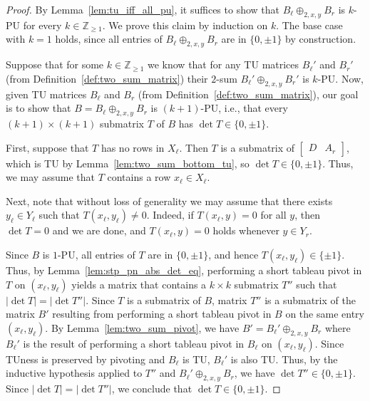 \begin{proof}
    By Lemma~\ref{lem:tu_iff_all_pu}, it suffices to show that $B_{\ell} \oplus_{2, x, y} B_{r}$ is $k$-PU for every $k \in \mathbb{Z}_{\geq 1}$. We prove this claim by induction on $k$. The base case with $k = 1$ holds, since all entries of $B_{\ell} \oplus_{2, x, y} B_{r}$ are in $\{0, \pm 1\}$ by construction.

    Suppose that for some $k \in \mathbb{Z}_{\geq 1}$ we know that for any TU matrices $B_{\ell}'$ and $B_{r}'$ (from Definition~\ref{def:two_sum_matrix}) their $2$-sum $B_{\ell}' \oplus_{2, x, y} B_{r}'$ is $k$-PU. Now, given TU matrices $B_{\ell}$ and $B_{r}$ (from Definition~\ref{def:two_sum_matrix}), our goal is to show that $B = B_{\ell} \oplus_{2, x, y} B_{r}$ is $(k + 1)$-PU, i.e., that every $(k + 1) \times (k + 1)$ submatrix $T$ of $B$ has $\det T \in \{0, \pm 1\}$.

    First, suppose that $T$ has no rows in $X_{\ell}$. Then $T$ is a submatrix of $\begin{bmatrix} D & A_{r} \end{bmatrix}$, which is TU by Lemma~\ref{lem:two_sum_bottom_tu}, so $\det T \in \{0, \pm 1\}$. Thus, we may assume that $T$ contains a row $x_{\ell} \in X_{\ell}$.

    Next, note that without loss of generality we may assume that there exists $y_{\ell} \in Y_{\ell}$ such that $T (x_{\ell}, y_{\ell}) \neq 0$. Indeed, if $T (x_{\ell}, y) = 0$ for all $y$, then $\det T = 0$ and we are done, and $T (x_{\ell}, y) = 0$ holds whenever $y \in Y_{r}$.

    Since $B$ is $1$-PU, all entries of $T$ are in $\{0, \pm 1\}$, and hence $T (x_{\ell}, y_{\ell}) \in \{\pm 1\}$. Thus, by Lemma~\ref{lem:stp_pn_abs_det_eq}, performing a short tableau pivot in $T$ on $(x_{\ell}, y_{\ell})$ yields a matrix that contains a $k \times k$ submatrix $T''$ such that $|\det T| = |\det T''|$. Since $T$ is a submatrix of $B$, matrix $T''$ is a submatrix of the matrix $B'$ resulting from performing a short tableau pivot in $B$ on the same entry $(x_{\ell}, y_{\ell})$. By Lemma~\ref{lem:two_sum_pivot}, we have $B' = B_{\ell}' \oplus_{2, x, y} B_{r}$ where $B_{\ell}'$ is the result of performing a short tableau pivot in $B_{\ell}$ on $(x_{\ell}, y_{\ell})$. Since TUness is preserved by pivoting and $B_{\ell}$ is TU, $B_{\ell}'$ is also TU. Thus, by the inductive hypothesis applied to $T''$ and $B_{\ell}' \oplus_{2, x, y} B_{r}$, we have $\det T'' \in \{0, \pm 1\}$. Since $|\det T| = |\det T''|$, we conclude that $\det T \in \{0, \pm 1\}$.
\end{proof}

